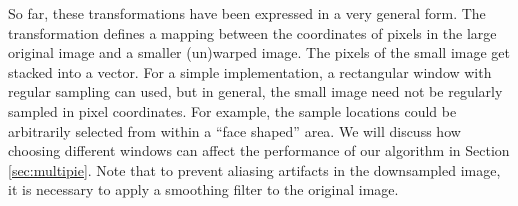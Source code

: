 \documentclass[12pt,journal,draftcls,letterpaper,onecolumn]{IEEEtran}
\begin{document}
So far, these transformations have been expressed in a very
general form.  The transformation defines a mapping between the
coordinates of pixels in the large original image and a smaller
(un)warped image. The pixels of the small image get stacked into a vector.
For a simple implementation, a rectangular window with
regular sampling can used, but in general, the small image need
not be regularly sampled in pixel coordinates.  For example,
the sample locations could be arbitrarily selected from within a
``face shaped'' area. We will discuss how choosing
different windows can affect the performance of our algorithm
in Section \ref{sec:multipie}. Note that to prevent aliasing
artifacts in the downsampled image, it is necessary to apply a
smoothing filter to the original image.
\end{document}
